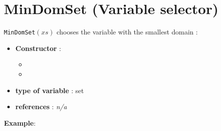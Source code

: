 \section{MinDomSet (Variable selector)}\label{mindomset:mindomsetvarselector}\hypertarget{mindomset:mindomsetvarselector}{}
\begin{notedef}
  \texttt{MinDomSet}$(xs)$ chooses the variable with the smallest domain :
\end{notedef}

\begin{itemize}
	\item \textbf{Constructor} : 
	\begin{itemize}
	\item {}
	\item {}
	\end{itemize}	
	\item \textbf{type of variable} : set
	\item \textbf{references} : \emph{n/a}
\end{itemize}

\textbf{Example}:
%

